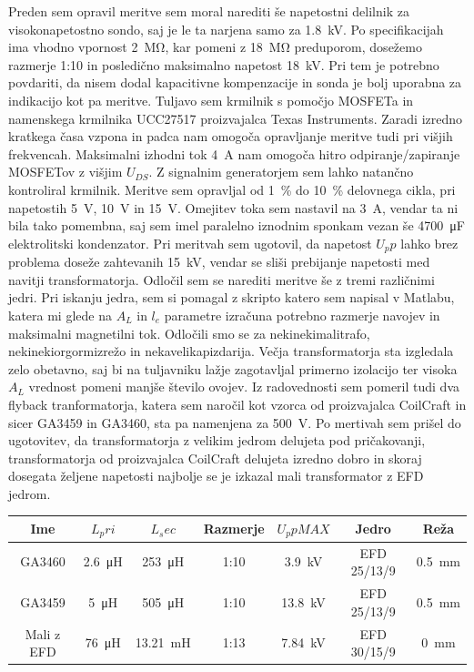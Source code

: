 \documentclass[a4paper,twoside,openright,12pt,slovene]{book}
\begin{document}
Preden sem opravil meritve sem moral narediti še napetostni delilnik za visokonapetostno sondo, saj je le ta narjena samo za \SI{1.8}{\kilo\volt}. Po specifikacijah ima vhodno vpornost \SI{2}{\mega\ohm}, kar pomeni z \SI{18}{\mega\ohm} preduporom, dosežemo razmerje 1:10 in posledično maksimalno napetost \SI{18}{\kilo\volt}. Pri tem je potrebno povdariti, da nisem dodal kapacitivne kompenzacije in sonda je bolj uporabna za indikacijo kot pa meritve. Tuljavo sem krmilnik s pomočjo MOSFETa in namenskega krmilnika UCC27517 proizvajalca Texas Instruments. Zaradi izredno kratkega časa vzpona in padca nam omogoča opravljanje meritve tudi pri višjih frekvencah. Maksimalni izhodni tok \SI{4}{\ampere} nam omogoča hitro odpiranje/zapiranje MOSFETov z višjim \(U_{DS}\). Z signalnim generatorjem sem lahko natančno kontroliral krmilnik. Meritve sem opravljal od \SI{1}{\percent} do \SI{10}{\percent} delovnega cikla, pri napetostih \SI{5}{\volt}, \SI{10}{\volt} in \SI{15}{\volt}. Omejitev toka sem nastavil na \SI{3}{\ampere}, vendar ta ni bila tako pomembna, saj sem imel paralelno iznodnim sponkam vezan še \SI{4700}{\micro\farad} elektrolitski kondenzator. Pri meritvah sem ugotovil, da napetost \(U_pp\) lahko brez problema doseže zahtevanih \SI{15}{\kilo\volt}, vendar se sliši prebijanje napetosti med navitji transformatorja. Odločil sem se narediti meritve še z tremi različnimi jedri. Pri iskanju jedra, sem si pomagal z skripto katero sem napisal v Matlabu, katera mi glede na \(A_L\) in \(l_e\) parametre izračuna potrebno razmerje navojev in maksimalni magnetilni tok. Odločili smo se za nekinekimalitrafo, nekinekiorgormizrežo in nekavelikapizdarija. Večja transformatorja sta izgledala zelo obetavno, saj bi na tuljavniku lažje zagotavljal primerno izolacijo ter visoka \(A_L\) vrednost pomeni manjše število ovojev. Iz radovednosti sem pomeril tudi dva flyback tranformatorja, katera sem naročil kot vzorca od proizvajalca CoilCraft in sicer GA3459 in GA3460, sta pa namenjena za \SI{500}{\volt}. Po mertivah sem prišel do ugotovitev, da transformatorja z velikim jedrom delujeta pod pričakovanji, transformatorja od proizvajalca CoilCraft delujeta izredno dobro in skoraj dosegata željene napetosti najbolje se je izkazal mali transformator z EFD jedrom. 
 
\begin{center}
\begin{tabular}{||c|c|c|c|c|c|c||}
\hline
Ime & \(L_pri\) & \(L_sec\) & Razmerje & \(U_ppMAX\) & Jedro & Reža \\ [0.5ex]
\hline\hline
GA3460 & \SI{2.6}{\micro\henry} & \SI{253}{\micro\henry} & 1:10 & \SI{3.9}{\kilo\volt} & EFD 25/13/9 & \SI{0.5}{\milli\meter} \\
\hline
GA3459 & \SI{5}{\micro\henry} & \SI{505}{\micro\henry} & 1:10 & \SI{13.8}{\kilo\volt} & EFD 25/13/9 & \SI{0.5}{\milli\meter} \\
\hline
Mali z EFD & \SI{76}{\micro\henry} & \SI{13.21}{\milli\henry} & 1:13 & \SI{7.84}{\kilo\volt} & EFD 30/15/9 & \SI{0}{\milli\meter} \\
\hline
\end{tabular}
\label{table:1}
\end{center}
\end{document}
